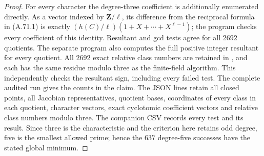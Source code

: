 \documentclass[11pt]{article}
\begin{document}
\begin{proof}
For every character the degree-three coefficient is
additionally enumerated directly. As a vector indexed
by $\mathbf Z/\ell$, its difference from the reciprocal
formula in (A.71.1) is exactly
$(h(C)/\ell)(1+X+\cdots+X^{\ell-1})$; the program
checks every coefficient of this identity. Resultant
and gcd tests agree for all $2692$ quotients.
The separate program 
also computes the full positive integer resultant for
every quotient. All $2692$ exact relative class numbers
are retained in
, and each has
the same residue modulo three as the finite-field
algorithm. This independently checks the resultant sign,
including every failed test.
The complete audited run gives the counts in the
claim. The JSON lines retain all closed points,
all Jacobian representatives, quotient bases,
coordinates of every class in each quotient,
character vectors, exact cyclotomic coefficient
vectors and relative class numbers modulo three.
The companion CSV records every test and its result.
Since three is the characteristic and the criterion
here retains odd degree, five is the smallest allowed
prime; hence the $637$ degree-five successes have
the stated global minimum.
\end{proof}
\end{document}
